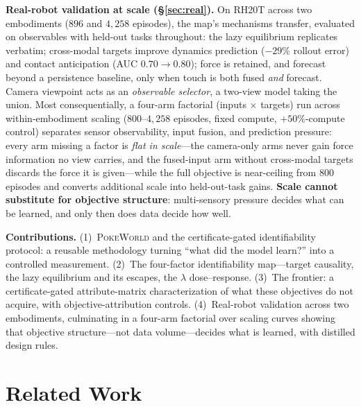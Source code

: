 \documentclass{article} %
\newcommand{\pokeworld}{\textsc{PokeWorld}}
\begin{document}
\textbf{Real-robot validation at scale (\S\ref{sec:real}).} On RH20T
\citep{fang2023rh20t} across two embodiments ($896$ and $4{,}258$
episodes), the map's mechanisms transfer, evaluated on observables with
held-out tasks throughout:
the lazy equilibrium replicates verbatim; cross-modal targets improve dynamics
prediction ($-29\%$ rollout error) and contact anticipation (AUC $0.70 \rightarrow
0.80$); force is retained, and forecast beyond a persistence baseline, only
when touch is both fused \emph{and} forecast. Camera viewpoint acts as
an \emph{observable selector}, a two-view model taking the union. Most
consequentially, a four-arm factorial (inputs $\times$ targets) run
across within-embodiment scaling ($800$--$4{,}258$ episodes, fixed compute,
$+50\%$-compute control) separates sensor observability, input fusion, and
prediction pressure: every arm missing a factor is \emph{flat in
scale}---the camera-only arms never gain force information no view carries,
and the fused-input arm without cross-modal targets discards the force it is
given---while the full objective is near-ceiling from $800$ episodes and
converts additional scale into held-out-task gains. \textbf{Scale cannot
substitute for objective structure}: multi-sensory pressure decides what can
be learned, and only then does data decide how well.

\textbf{Contributions.} (1)~\pokeworld{} and the certificate-gated identifiability
protocol: a reusable methodology turning ``what did the model learn?'' into a
controlled measurement. (2)~The four-factor identifiability map---target
causality, the lazy equilibrium and its escapes, the $\lambda$
dose--response. (3)~The frontier: a certificate-gated attribute-matrix
characterization of what these objectives do not acquire, with
objective-attribution controls. (4)~Real-robot validation across two
embodiments, culminating in a four-arm factorial over scaling curves showing
that objective structure---not data volume---decides what is learned, with
distilled design rules.

\section{Related Work}
\label{sec:related}
\end{document}
